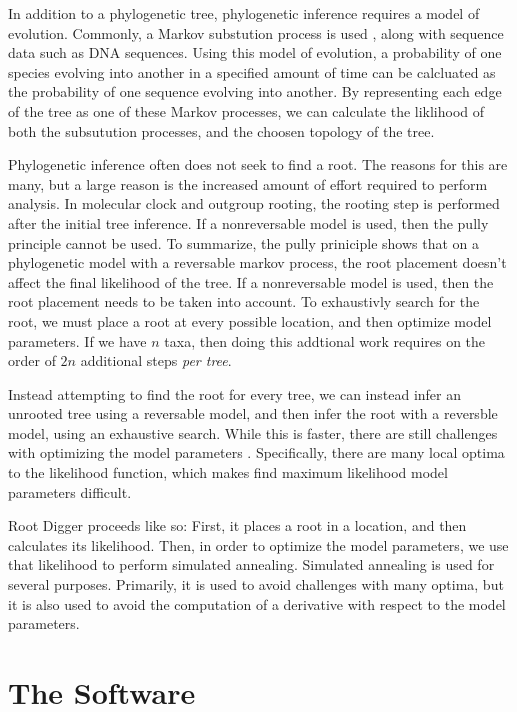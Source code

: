 \documentclass{article}
\begin{document}
In addition to a phylogenetic tree, phylogenetic inference requires a model of
evolution. Commonly, a Markov substution process is used
\cite{yang_computational_2006}, along with sequence data such as DNA sequences.
Using this model of evolution, a probability of one species evolving into
another in a specified amount of time can be calcluated as the probability of
one sequence evolving into another. By representing each edge of the tree as one
of these Markov processes, we can calculate the liklihood of both the
subsutution processes, and the choosen topology of the tree.

Phylogenetic inference often does not seek to find a root. The reasons for this
are many, but a large reason is the increased amount of effort required to
perform analysis. In molecular clock and outgroup rooting, the rooting step is
performed after the initial tree inference. If a nonreversable model is used,
then the pully principle \cite{felsenstein_evolutionary_1981} cannot be used. To
summarize, the pully priniciple shows that on a phylogenetic model with a
reversable markov process, the root placement doesn't affect the final
likelihood of the tree. If a nonreversable model is used, then the root
placement needs to be taken into account. To exhaustivly search for the root, we
must place a root at every possible location, and then optimize model
parameters. If we have $n$ taxa, then doing this addtional work requires on the
order of $2n$ additional steps {\em per tree}.

Instead attempting to find the root for every tree, we can instead infer an
unrooted tree using a reversable model, and then infer the root with a
reversble model, using an exhaustive search. While this is faster, there are
still challenges with optimizing the model parameters
\cite{huelsenbeck_inferring_2002}. Specifically, there are many local optima to
the likelihood function, which makes find maximum likelihood model parameters
difficult.

Root Digger proceeds like so: First, it places a root in a location, and then
calculates its likelihood. Then, in order to optimize the model parameters, we
use that likelihood to perform simulated annealing. Simulated annealing is used
for several purposes. Primarily, it is used to avoid challenges with many
optima, but it is also used to avoid the computation of a derivative with
respect to the model parameters.

\section{The Software}
\end{document}
